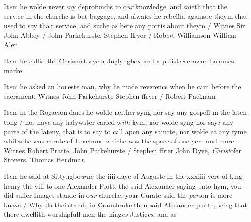 \documentclass[12pt, a4paper]{book}
\begin{document}
		
				\marginpar[\vspace{0.5cm}{\textcolor{Gray}{offensive}}]{}
			
	
		\ifthenelse{\isodd{\thepage}}
		{\reversemarginpar}
		{\normalmarginpar}
		It\textit{e}m he wolde never say deprofundis to o\textit{ur} knowledge, and saieth
  that the service in the churche is but baggage, and alwaies
 he rebellid againste theym that used to say thair service, and
 suche as bere any portis about theym / Witnes Sir John
 	Abbey / John Parkehurste, Stephen ffryer / Rob\textit{er}t Williamson
		Willi\textit{a}m Alen
	
 
				\marginpar[\vspace{0.5cm}{\textcolor{Gray}{Anno 1540}}]{}
			
	
				\marginpar[\vspace{0.5cm}{\textcolor{Gray}{seditious}}]{}
			
	
				\marginpar[\vspace{0.5cm}{\textcolor{Gray}{vi articles}}]{}
			
	
		\ifthenelse{\isodd{\thepage}}
		{\reversemarginpar}
		{\normalmarginpar}
		It\textit{e}m he callid the Chrismatorye a Juglyngbox and a preist\textit{es}
  crowne balames marke
  
		\ifthenelse{\isodd{\thepage}}
		{\reversemarginpar}
		{\normalmarginpar}
		It\textit{e}m he asked an honeste man, why he made reverence when
  	he cam before the sacrament, Witnes John Parkehurste
  	Stephen ffryer / Robert Packnam
	
 
 	
				\marginpar[\vspace{0.5cm}{\textcolor{Gray}{ceremonies}}]{}
			
	
		\ifthenelse{\isodd{\thepage}}
		{\reversemarginpar}
		{\normalmarginpar}
		It\textit{e}m in the Rogacion daies he wolde neither syng nor say any gospell
 in the laten tong / nor have any halywater caried w\textit{ith} hym, nor
 wolde syng nor saye any parte of the lateny, that is to say to
 call apon any saincte, nor wolde at any tyme whiles he was
		curate of Leneham. whiche was the space of one yere and more
		Witnes Robert Pratte, John Parkehurste / Stephen ffrier
		John Dyve, \textit{Christ}ofer Stoners, Thomas Hendma\textit{n}
	
 
			
	
		\ifthenelse{\isodd{\thepage}}
		{\reversemarginpar}
		{\normalmarginpar}
		It\textit{e}m he said at Sittyngbo\textit{ur}ne the iiii daye of Auguste in the xxxiiii
		yere of king henry the viii to one Alexander Plott, the said
		Alexander saying unto hym, you did suffer Images stande
 in o\textit{ur} churche, your Curate said the \textit{par}son is more knave / Why
		do thei stande in Cranebroke then said Alexander plotte, seing
 that there dwellith wurshipfull men the king\textit{es} Justic\textit{es}, and as
 
\end{document}
